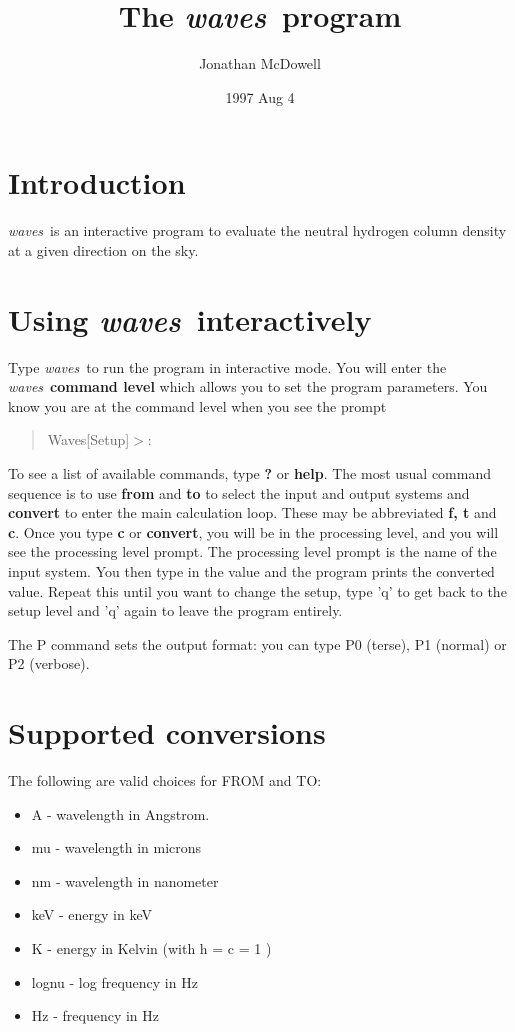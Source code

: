 \documentclass[12pt]{article}
\newcommand{\pr}{{\it waves}~}
\newcommand{\prompt}{Waves[Setup]$>$:~}
\begin{document}
\title {The \pr program}

\author{Jonathan McDowell}

\date{1997 Aug 4}


\maketitle




\section{Introduction}

\pr is an interactive program to evaluate the neutral hydrogen
column density at a given direction on the sky.

\section{ Using \pr interactively}

Type \pr to run the program in interactive mode.
You will enter the \pr {\bf command level} which allows you to set the
program parameters. You know you are at the command level when you see the
prompt
\begin{quote}
\prompt
\end{quote}

To see a list of available commands, type {\bf ?} or {\bf help}. The most
usual command sequence is to use {\bf from } and {\bf to } to select the
input and output systems and {\bf convert } to enter the main calculation loop. These
 may be abbreviated
{\bf f, t} and {\bf c}.  
Once you type {\bf c} or {\bf convert}, you will be 
in the processing level, and you will see the processing level prompt. The processing level
prompt is the name of the input system. You then
type in the value and the program prints the converted value.
Repeat this until you want to change the setup, type 'q' to get back to the
setup level and 'q' again to leave the program entirely.

The P command sets the output format: you can type P0 (terse), P1 (normal)
or P2 (verbose).

\section{Supported conversions}

The following are valid choices for FROM and TO:
\begin{itemize}
\item A  - wavelength in Angstrom.
\item mu - wavelength in microns
\item nm - wavelength in nanometer
\item keV - energy in keV
\item K - energy in Kelvin  (with h = c = 1 )
\item lognu - log frequency in Hz
\item Hz - frequency in Hz
\end{itemize}
\end{document}
